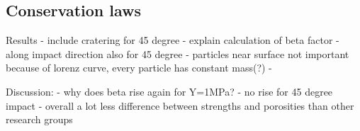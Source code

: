 \subsection{Conservation laws}



Results
- include cratering for 45 degree
- explain calculation of beta factor
- along impact direction also for 45 degree
- particles near surface not important because of lorenz curve, every particle has constant mass(?)
-

Discussion:
- why does beta rise again for Y=1MPa?
- no rise for 45 degree impact
- overall a lot less difference between strengths and porosities than other research groups
